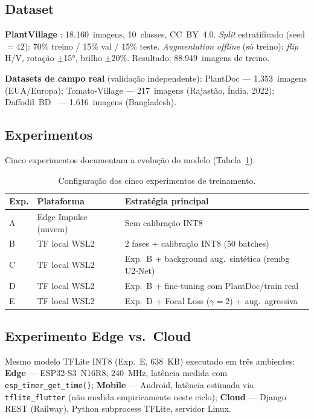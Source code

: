 \documentclass[12pt]{article}
\begin{document}
\subsection{Dataset}

\textbf{PlantVillage} \cite{hughes2015}: 18.160~imagens, 10~classes, CC~BY~4.0.
\textit{Split} estratificado (seed$=42$): 70\% treino / 15\% val / 15\% teste.
\textit{Augmentation} \textit{offline} (só treino): \textit{flip} H/V, rotação $\pm$15°, brilho $\pm$20\%.
Resultado: 88.949~imagens de treino.

\textbf{Datasets de campo real} (validação independente):
PlantDoc \cite{singh2020} --- 1.353~imagens (EUA/Europa);
Tomato-Village \cite{gehlot2023} --- 217~imagens (Rajastão, Índia, 2022);
Daffodil~BD~\cite{daffodilbd2024} --- 1.616~imagens (Bangladesh).

\subsection{Experimentos}

Cinco experimentos documentam a evolução do modelo (Tabela~\ref{tab:experimentos}).

\begin{table}[ht]
\centering
\caption{Configuração dos cinco experimentos de treinamento.}
\label{tab:experimentos}
\begin{tabular}{@{}llp{5.5cm}@{}}
\toprule
\textbf{Exp.} & \textbf{Plataforma} & \textbf{Estratégia principal} \\
\midrule
A & Edge Impulse (nuvem) & Sem calibração INT8 \\
B & TF local WSL2 & 2 fases + calibração INT8 (50 batches) \\
C & TF local WSL2 & Exp.~B + background aug.\ sintética (rembg U2-Net) \\
D & TF local WSL2 & Exp.~B + fine-tuning com PlantDoc/train real \\
E & TF local WSL2 & Exp.~D + Focal Loss ($\gamma=2$) + aug.\ agressiva \\
\bottomrule
\end{tabular}
\end{table}

\subsection{Experimento Edge vs.\ Cloud}

Mesmo modelo TFLite INT8 (Exp.~E, 638~KB) executado em três ambientes:
\textbf{Edge} --- ESP32-S3~N16R8, 240~MHz, latência medida com
\texttt{esp\_timer\_get\_time()}; \textbf{Mobile} --- Android, latência estimada
via \texttt{tflite\_flutter} (não medida empiricamente neste ciclo);
\textbf{Cloud} --- Django REST (Railway), Python subprocess TFLite, servidor Linux.
\end{document}
